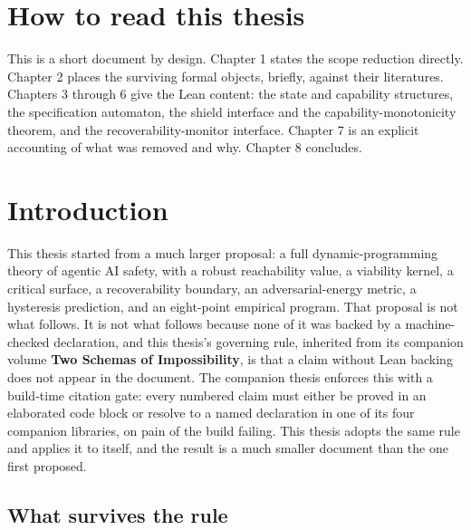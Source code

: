 \documentclass{memoir}
\begin{document}
\chapter{How to read this thesis}\label{Capability--Monotonicity--in--a--Formal--Skeleton--for--Agentic--AI--Safety----How--to--read--this--thesis}

This is a short document by design. Chapter 1 states the scope reduction
directly. Chapter 2 places the surviving formal objects, briefly, against
their literatures. Chapters 3 through 6 give the Lean content: the state
and capability structures, the specification automaton, the shield
interface and the capability-monotonicity theorem, and the
recoverability-monitor interface. Chapter 7 is an explicit accounting of
what was removed and why. Chapter 8 concludes.




\chapter{Introduction}\label{Capability--Monotonicity--in--a--Formal--Skeleton--for--Agentic--AI--Safety----Introduction}

This thesis started from a much larger proposal: a full dynamic-programming
theory of agentic AI safety, with a robust reachability value, a viability
kernel, a critical surface, a recoverability boundary, an adversarial-energy
metric, a hysteresis prediction, and an eight-point empirical program. That
proposal is not what follows. It is not what follows because none of it was
backed by a machine-checked declaration, and this thesis's governing rule,
inherited from its companion volume \textbf{Two Schemas of Impossibility}, is that a
claim without Lean backing does not appear in the document. The companion
thesis enforces this with a build-time citation gate: every numbered claim
must either be proved in an elaborated code block or resolve to a named
declaration in one of its four companion libraries, on pain of the build
failing. This thesis adopts the same rule and applies it to itself, and the
result is a much smaller document than the one first proposed.



\section{What survives the rule}\label{Capability--Monotonicity--in--a--Formal--Skeleton--for--Agentic--AI--Safety----Introduction----What--survives--the--rule}
\end{document}

